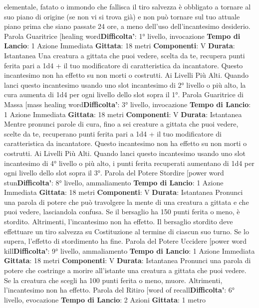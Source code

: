 \begin{multicols}{2}
elementale, fatato o immondo che fallisca il tiro
salvezza è obbligato a tornare al suo piano di origine
(se non vi si trova già) e non può tornare sul tuo attuale
piano prima che siano passate 24 ore, a meno dell’uso
dell’incantesimo desiderio.
Parola Guaritrice
[healing word\textbf{Difficolta'}:
1° livello, invocazione
\textbf{Tempo di Lancio}: 1 Azione Immediata
\textbf{Gittata}: 18 metri
\textbf{Componenti}: V
\textbf{Durata}: Istantanea
Una creatura a gittata che puoi vedere, scelta da te,
recupera punti ferita pari a 1d4 + il tuo modificatore di
caratteristica da incantatore. Questo incantesimo non
ha effetto su non morti o costrutti.
Ai Livelli Più Alti. Quando lanci questo incantesimo
usando uno slot incantesimo di 2° livello o più alto, la
cura aumenta di 1d4 per ogni livello dello slot sopra il
1°.
Parola Guaritrice di Massa
[mass healing word\textbf{Difficolta'}:
3° livello, invocazione
\textbf{Tempo di Lancio}: 1 Azione Immediata
\textbf{Gittata}: 18 metri
\textbf{Componenti}: V
\textbf{Durata}: Istantanea
Mentre pronunci parole di cura, fino a sei creature a
gittata che puoi vedere, scelte da te, recuperano punti
ferita pari a 1d4 + il tuo modificatore di caratteristica da
incantatore. Questo incantesimo non ha effetto su non
morti o costrutti.
Ai Livelli Più Alti. Quando lanci questo incantesimo
usando uno slot incantesimo di 4° livello o più alto, i
punti ferita recuperati aumentano di 1d4 per ogni livello
dello slot sopra il 3°.
Parola del Potere Stordire
[power word stun\textbf{Difficolta'}:
8° livello, ammaliamento
\textbf{Tempo di Lancio}: 1 Azione Immediata
\textbf{Gittata}: 18 metri
\textbf{Componenti}: V
\textbf{Durata}: Istantanea
Pronunci una parola di potere che può travolgere la
mente di una creatura a gittata e che puoi vedere,
lasciandola confusa. Se il bersaglio ha 150 punti ferita o
meno, è stordito. Altrimenti, l’incantesimo non ha
effetto.
Il bersaglio stordito deve effettuare un tiro salvezza su
Costituzione al termine di ciascun suo turno. Se lo
supera, l’effetto di stordimento ha fine.
Parola del Potere Uccidere
[power word kill\textbf{Difficolta'}:
9° livello, ammaliamento
\textbf{Tempo di Lancio}: 1 Azione Immediata
\textbf{Gittata}: 18 metri
\textbf{Componenti}: V
\textbf{Durata}: Istantanea
Pronunci una parola di potere che costringe a morire
all’istante una creatura a gittata che puoi vedere. Se la
creatura che scegli ha 100 punti ferita o meno, muore.
Altrimenti, l’incantesimo non ha effetto.
Parola del Ritiro
[word of recall\textbf{Difficolta'}:
6° livello, evocazione
\textbf{Tempo di Lancio}: 2 Azioni
\textbf{Gittata}: 1 metro

\end{multicols}
